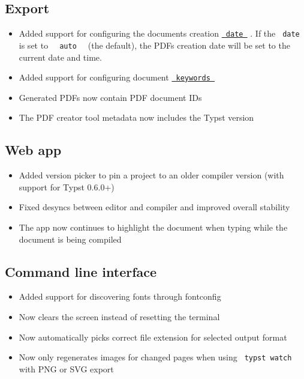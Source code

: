\subsection{Export}\label{export}

\begin{itemize}
\tightlist
\item
  Added support for configuring the document\textquotesingle s creation
  \href{/docs/reference/model/document/\#parameters-date}{\texttt{\ date\ }}
  . If the \texttt{\ date\ } is set to
  \texttt{\ }{\texttt{\ auto\ }}\texttt{\ } (the default), the
  PDF\textquotesingle s creation date will be set to the current date
  and time.
\item
  Added support for configuring document
  \href{/docs/reference/model/document/\#parameters-keywords}{\texttt{\ keywords\ }}
\item
  Generated PDFs now contain PDF document IDs
\item
  The PDF creator tool metadata now includes the Typst version
\end{itemize}

\subsection{Web app}\label{web-app}

\begin{itemize}
\tightlist
\item
  Added version picker to pin a project to an older compiler version
  (with support for Typst 0.6.0+)
\item
  Fixed desyncs between editor and compiler and improved overall
  stability
\item
  The app now continues to highlight the document when typing while the
  document is being compiled
\end{itemize}

\subsection{Command line interface}\label{command-line-interface}

\begin{itemize}
\tightlist
\item
  Added support for discovering fonts through fontconfig
\item
  Now clears the screen instead of resetting the terminal
\item
  Now automatically picks correct file extension for selected output
  format
\item
  Now only regenerates images for changed pages when using
  \texttt{\ typst\ watch\ } with PNG or SVG export
\end{itemize}

